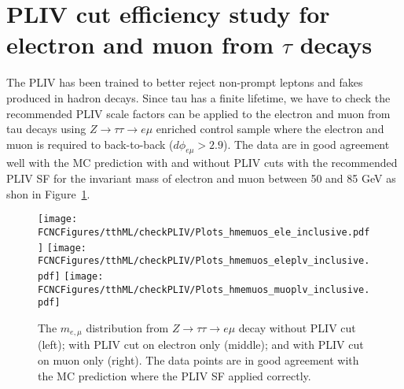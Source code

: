 \section{PLIV cut efficiency study for electron and muon from $\tau$ decays}
\label{sec:CheckPLIV}

The PLIV has been trained to better reject non-prompt leptons and fakes produced in hadron decays. Since tau has a finite lifetime, we have to check the
recommended PLIV scale factors can be applied to the electron and muon from tau decays using $Z\rightarrow \tau\tau\rightarrow e\mu$ enriched control sample
where the electron and muon is required to back-to-back ($d\phi_{e\mu}>2.9$). The data are in good agreement well with the MC prediction with and without
PLIV cuts with the recommended PLIV SF for the invariant mass of electron and muon between 50 and 85 GeV as shon in Figure~\ref{fig:ap9_checkpliv}. 


\begin{figure}[H]
\centering
\texttt{[image: \\FCNCFigures/tthML/checkPLIV/Plots\_hmemuos\_ele\_inclusive.pdf]}
\texttt{[image: \\FCNCFigures/tthML/checkPLIV/Plots\_hmemuos\_eleplv\_inclusive.pdf]}
\texttt{[image: \\FCNCFigures/tthML/checkPLIV/Plots\_hmemuos\_muoplv\_inclusive.pdf]}
\caption{ The $m_{e,\mu}$ distribution from $Z\rightarrow\tau\tau\rightarrow e\mu$ decay without PLIV cut (left); with PLIV cut on electron only (middle); and
  with PLIV cut on muon only (right). The data points are in good agreement with the MC prediction where the PLIV SF applied correctly.}
\label{fig:ap9_checkpliv}
\end{figure}

